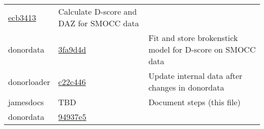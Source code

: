 \documentclass[]{book}
\begin{document}
\begin{longtable}[]{@{}lll@{}}
\begin{minipage}[t]{0.29\columnwidth}
\href{https://github.com/stefvanbuuren/donordata/commit/ecb3413b115c3193135b1af118597768b083dc41}{ecb3413}\strut
\end{minipage} & \begin{minipage}[t]{0.36\columnwidth}\raggedright
Calculate D-score and DAZ for SMOCC data\strut
\end{minipage}\tabularnewline
\begin{minipage}[t]{0.26\columnwidth}\raggedright
donordata\strut
\end{minipage} & \begin{minipage}[t]{0.29\columnwidth}\raggedright
\href{https://github.com/stefvanbuuren/donordata/commit/3fa9d4de347d09ccff32a887cf6bd8dadfdfaeb6}{3fa9d4d}\strut
\end{minipage} & \begin{minipage}[t]{0.36\columnwidth}\raggedright
Fit and store brokenstick model for D-score on SMOCC data\strut
\end{minipage}\tabularnewline
\begin{minipage}[t]{0.26\columnwidth}\raggedright
donorloader\strut
\end{minipage} & \begin{minipage}[t]{0.29\columnwidth}\raggedright
\href{https://github.com/stefvanbuuren/donorloader/commit/c22c44607b40ff6bda2009c25894362b68831275}{c22c446}\strut
\end{minipage} & \begin{minipage}[t]{0.36\columnwidth}\raggedright
Update internal data after changes in donordata\strut
\end{minipage}\tabularnewline
\begin{minipage}[t]{0.26\columnwidth}\raggedright
jamesdocs\strut
\end{minipage} & \begin{minipage}[t]{0.29\columnwidth}\raggedright
TBD\strut
\end{minipage} & \begin{minipage}[t]{0.36\columnwidth}\raggedright
Document steps (this file)\strut
\end{minipage}\tabularnewline
\begin{minipage}[t]{0.26\columnwidth}\raggedright
donordata\strut
\end{minipage} & \begin{minipage}[t]{0.29\columnwidth}\raggedright
\href{https://github.com/stefvanbuuren/donordata/commit/7983c3d81a69eb9c6b81a3e0f0668e892c5abf5a}{94937e5}\strut
\end{minipage} & \begin{minipage}[t]{0.36\columnwidth}\raggedright

\end{minipage}
\end{longtable}
\end{document}
